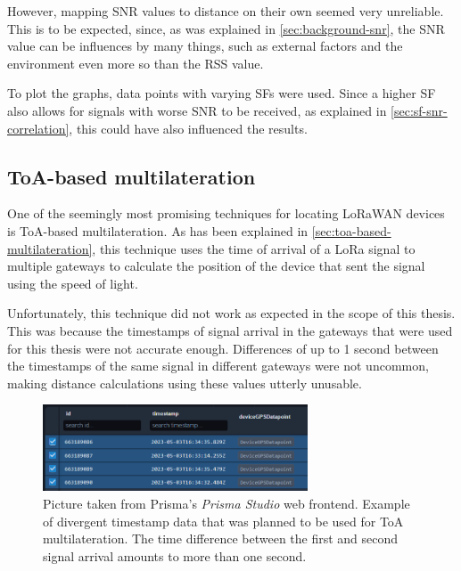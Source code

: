 However, mapping \ac{SNR} values to distance on their own seemed very unreliable.
This is to be expected, since, as was explained in \cref{sec:background-snr}, the \ac{SNR} value can be influences by many things, such as external factors and the environment even more so than the \ac{RSS} value.

To plot the graphs, data points with varying \acp{SF} were used.
Since a higher \ac{SF} also allows for signals with worse \ac{SNR} to be received, as explained in \cref{sec:sf-snr-correlation}, this could have also influenced the results.

\subsection{\acf{ToA}-based multilateration}\label{subsec:toa-based-multilateration-implementation}

One of the seemingly most promising techniques for locating \ac{LoRaWAN} devices is \ac{ToA}-based multilateration.
As has been explained in \cref{sec:toa-based-multilateration}, this technique uses the time of arrival of a \ac{LoRa} signal to multiple gateways to calculate the position of the device that sent the signal using the speed of light.

Unfortunately, this technique did not work as expected in the scope of this thesis.
This was because the timestamps of signal arrival in the gateways that were used for this thesis were not accurate enough.
Differences of up to 1 second between the timestamps of the same signal in different gateways were not uncommon, making distance calculations using these values utterly unusable.

\begin{figure}[htbp]
    \centering
    \includegraphics[width=0.7\textwidth]{pictures/multilateration/toa_bad_data_example_prisma_studio.png}
    \caption{
        Picture taken from Prisma's \emph{Prisma Studio} web frontend.
        Example of divergent timestamp data that was planned to be used for \ac{ToA} multilateration.
        The time difference between the first and second signal arrival amounts to more than one second.
    }\label{fig:toa-bad-data-example}
\end{figure}

